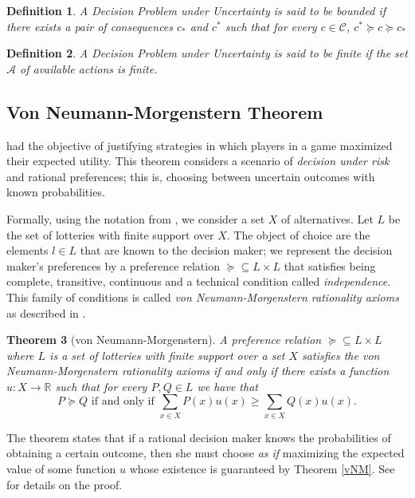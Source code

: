 \documentclass[review]{elsarticle}
\newtheorem{theorem}{Theorem}
\newtheorem{definition}[theorem]{Definition}
\begin{document}
\begin{definition}
A Decision Problem under Uncertainty is said to be bounded if there exists a pair of consequences $c_\ast$ and $c^\ast$ such that for every $c \in \mathcal{C}$, $c^{\ast} \succeq c \succeq c_\ast$
\end{definition}

\begin{definition}
A Decision Problem under Uncertainty is said to be finite if the set $\mathcal{A}$ of available actions is finite.
\end{definition}

\subsection{Von Neumann-Morgenstern Theorem}
\label{vNM-M}
\cite{von1944theory} had the objective of justifying strategies in which players in a game maximized their expected utility. This theorem considers a scenario of \textit{decision under risk} and rational preferences; this is, choosing between uncertain outcomes with known probabilities. 

Formally, using the notation from \cite{gilboa2009decision}, we consider a set $X$ of alternatives. Let $L$ be the set of lotteries with finite support over $X$. The object of choice are the elements $l \in L$ that are known to the decision maker; we represent the decision maker's preferences by a preference relation $\succeq \subseteq L \times L$ that  satisfies being complete, transitive, continuous and a technical condition called \textit{independence}. This family of conditions is called \textit{von Neumann-Morgenstern rationality axioms} as described in \cite{gilboa2009decision}.

\begin{theorem}[von Neumann-Morgenstern]{\label{vNM}}
A preference relation $\succeq \subseteq L \times L$ where $L$ is a set of lotteries with finite support over a set $X$ satisfies the von Neumann-Morgenstern rationality axioms if and only if there exists a function $u: X \to \mathbb{R}$ such that for every $P, Q \in L$ we have that
\begin{equation}
P \succeq Q \textrm{ if and only if } \sum_{x \in X} P(x) u(x) \geq \sum_{x \in X} Q(x) u(x). 
\end{equation}
\end{theorem}
The theorem states that if a rational decision maker knows the probabilities of obtaining a certain outcome, then she must choose \textit{as if} maximizing the expected value of some function $u$ whose existence is guaranteed by Theorem \ref{vNM}. See \cite{gilboa2009decision} for details on the proof.
\end{document}
